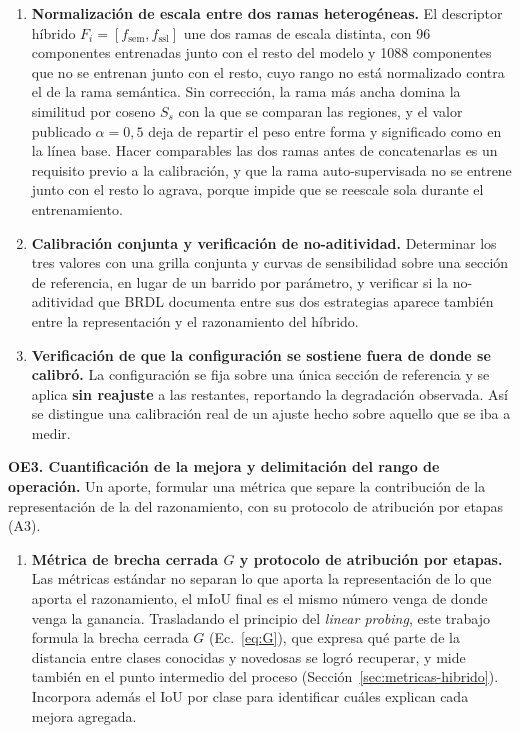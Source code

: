 \begin{enumerate}
\item[\textbf{A5}] \textbf{Normalización de escala entre dos ramas
heterogéneas.} El descriptor híbrido $F_i=[f_{\mathrm{sem}},f_{\mathrm{ssl}}]$ une dos
ramas de escala distinta, con 96 componentes entrenadas junto con el resto del
modelo y 1088 componentes que no se entrenan junto con el resto, cuyo rango no está normalizado contra el de
la rama semántica. Sin corrección, la rama más ancha domina la similitud por
coseno $S_s$ con la que se comparan las regiones, y el valor publicado
$\alpha=0{,}5$ deja de repartir el peso entre forma y significado como en la
línea base. Hacer comparables las dos ramas antes de concatenarlas es un
requisito previo a la calibración, y que la rama auto-supervisada no se entrene junto con el resto lo agrava, porque impide que se reescale sola
durante el entrenamiento.

\item[\textbf{A6}] \textbf{Calibración conjunta y verificación de
no-aditividad.} Determinar los tres valores con una grilla
conjunta y curvas de sensibilidad sobre una sección de referencia, en lugar de un
barrido por parámetro, y verificar si la no-aditividad que BRDL documenta entre
sus dos estrategias aparece también entre la representación y el razonamiento del
híbrido.

\item[\textbf{A7}] \textbf{Verificación de que la configuración se sostiene fuera
de donde se calibró.} La configuración se fija sobre una única sección de
referencia y se aplica \textbf{sin reajuste} a las restantes, reportando
la degradación observada. Así se distingue una calibración real de un ajuste hecho
sobre aquello que se iba a medir.
\end{enumerate}

\medskip
\noindent\textbf{OE3. Cuantificación de la mejora y delimitación del rango de
operación.} Un aporte, formular una métrica que separe la contribución de la
representación de la del razonamiento, con su protocolo de atribución por etapas
(A3).

\begin{enumerate}
\item[\textbf{A3}] \textbf{Métrica de brecha cerrada $G$ y protocolo de
atribución por etapas.} Las métricas estándar no separan lo que aporta la
representación de lo que aporta el razonamiento, el mIoU final es el mismo número
venga de donde venga la ganancia. Trasladando el principio del \emph{linear
probing}, este trabajo formula la brecha cerrada $G$ (Ec.~\eqref{eq:G}), que
expresa qué parte de la distancia entre clases conocidas y novedosas se logró
recuperar, y mide también en el punto intermedio del proceso
(Sección~\ref{sec:metricas-hibrido}). Incorpora además el IoU por clase para
identificar cuáles explican cada mejora agregada.
\end{enumerate}


